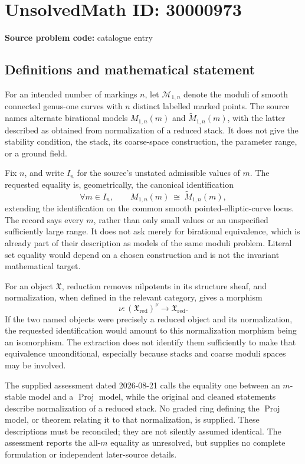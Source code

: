 \documentclass[11pt]{article}
\begin{document}
\section*{UnsolvedMath ID: 30000973}
\textbf{Source problem code:} catalogue entry
\subsection{Definitions and mathematical statement}
For an intended number of markings \(n\), let \(\mathcal M_{1,n}\) denote the moduli of smooth connected genus-one curves with \(n\) distinct labelled marked points. The source names alternate birational models \(M_{1,n}(m)\) and \(\widetilde M_{1,n}(m)\), with the latter described as obtained from normalization of a reduced stack. It does not give the stability condition, the stack, its coarse-space construction, the parameter range, or a ground field.

Fix \(n\), and write \(I_n\) for the source's unstated admissible values of \(m\). The requested equality is, geometrically, the canonical identification
\[
 \forall m\in I_n,\qquad
 M_{1,n}(m)\ \cong\ \widetilde M_{1,n}(m),
\]
extending the identification on the common smooth pointed-elliptic-curve locus. The record says every \(m\), rather than only small values or an unspecified sufficiently large range. It does not ask merely for birational equivalence, which is already part of their description as models of the same moduli problem. Literal set equality would depend on a chosen construction and is not the invariant mathematical target.

For an object \(\mathfrak X\), reduction removes nilpotents in its structure sheaf, and normalization, when defined in the relevant category, gives a morphism
\[
 \nu:(\mathfrak X_{\mathrm{red}})^\nu\longrightarrow\mathfrak X_{\mathrm{red}}.
\]
If the two named objects were precisely a reduced object and its normalization, the requested identification would amount to this normalization morphism being an isomorphism. The extraction does not identify them sufficiently to make that equivalence unconditional, especially because stacks and coarse moduli spaces may be involved.

The supplied assessment dated 2026-08-21 calls the equality one between an \(m\)-stable model and a \(\operatorname{Proj}\) model, while the original and cleaned statements describe normalization of a reduced stack. No graded ring defining the \(\operatorname{Proj}\) model, or theorem relating it to that normalization, is supplied. These descriptions must be reconciled; they are not silently assumed identical. The assessment reports the all-\(m\) equality as unresolved, but supplies no complete formulation or independent later-source details.
\end{document}
